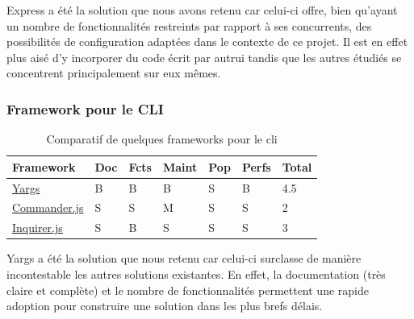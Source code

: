 Express a été la solution que nous avons retenu car celui-ci offre, bien qu'ayant un nombre de fonctionnalités restreints par rapport à ses concurrents, des possibilités de configuration  adaptées dans le contexte de ce projet. Il est en effet plus aisé d'y incorporer du code écrit par autrui tandis que les autres étudiés se concentrent principalement sur eux mêmes. 

\subsubsection*{Framework pour le CLI}

\begin{table}[H]
    \centering
    \begin{tabular}{| l | l | l | l | l | l | l |}
    \hline
        Framework & Doc & Fcts & Maint & Pop & Perfs & Total \\
    \hline
        \href{http://yargs.js.org/}{Yargs} &
        B &  
        B &
        B &            
        S &              
        B &   
        4.5 \\
    \hline
        \href{https://github.com/tj/commander.js}{Commander.js} &
        S &                
        S &   
        M &
        S &              
        S &  
        2 \\
    \hline
        \href{https://github.com/SBoudrias/Inquirer.js}{Inquirer.js} &
        S &                
        B &     
        S &
        S &              
        S &      
        3 \\  
    \hline
    \end{tabular}
    \caption{Comparatif de quelques frameworks pour le \Gls{cli}}
    \label{table:compFrameworksCLI}
\end{table}

Yargs a été la solution que nous retenu car celui-ci surclasse de manière incontestable les autres solutions existantes. En effet, la documentation (très claire et complète) et le nombre de fonctionnalités permettent une rapide adoption pour construire une solution dans les plus brefs délais. 